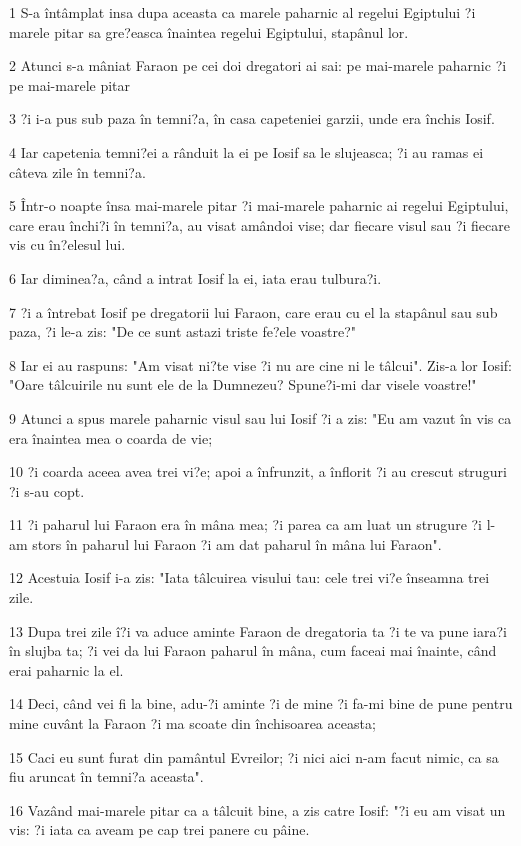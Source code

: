 \par 1 S-a întâmplat insa dupa aceasta ca marele paharnic al regelui Egiptului ?i marele pitar sa gre?easca înaintea regelui Egiptului, stapânul lor.
\par 2 Atunci s-a mâniat Faraon pe cei doi dregatori ai sai: pe mai-marele paharnic ?i pe mai-marele pitar
\par 3 ?i i-a pus sub paza în temni?a, în casa capeteniei garzii, unde era închis Iosif.
\par 4 Iar capetenia temni?ei a rânduit la ei pe Iosif sa le slujeasca; ?i au ramas ei câteva zile în temni?a.
\par 5 Într-o noapte însa mai-marele pitar ?i mai-marele paharnic ai regelui Egiptului, care erau închi?i în temni?a, au visat amândoi vise; dar fiecare visul sau ?i fiecare vis cu în?elesul lui.
\par 6 Iar diminea?a, când a intrat Iosif la ei, iata erau tulbura?i.
\par 7 ?i a întrebat Iosif pe dregatorii lui Faraon, care erau cu el la stapânul sau sub paza, ?i le-a zis: "De ce sunt astazi triste fe?ele voastre?"
\par 8 Iar ei au raspuns: "Am visat ni?te vise ?i nu are cine ni le tâlcui". Zis-a lor Iosif: "Oare tâlcuirile nu sunt ele de la Dumnezeu? Spune?i-mi dar visele voastre!"
\par 9 Atunci a spus marele paharnic visul sau lui Iosif ?i a zis: "Eu am vazut în vis ca era înaintea mea o coarda de vie;
\par 10 ?i coarda aceea avea trei vi?e; apoi a înfrunzit, a înflorit ?i au crescut struguri ?i s-au copt.
\par 11 ?i paharul lui Faraon era în mâna mea; ?i parea ca am luat un strugure ?i l-am stors în paharul lui Faraon ?i am dat paharul în mâna lui Faraon".
\par 12 Acestuia Iosif i-a zis: "Iata tâlcuirea visului tau: cele trei vi?e înseamna trei zile.
\par 13 Dupa trei zile î?i va aduce aminte Faraon de dregatoria ta ?i te va pune iara?i în slujba ta; ?i vei da lui Faraon paharul în mâna, cum faceai mai înainte, când erai paharnic la el.
\par 14 Deci, când vei fi la bine, adu-?i aminte ?i de mine ?i fa-mi bine de pune pentru mine cuvânt la Faraon ?i ma scoate din închisoarea aceasta;
\par 15 Caci eu sunt furat din pamântul Evreilor; ?i nici aici n-am facut nimic, ca sa fiu aruncat în temni?a aceasta".
\par 16 Vazând mai-marele pitar ca a tâlcuit bine, a zis catre Iosif: "?i eu am visat un vis: ?i iata ca aveam pe cap trei panere cu pâine.
